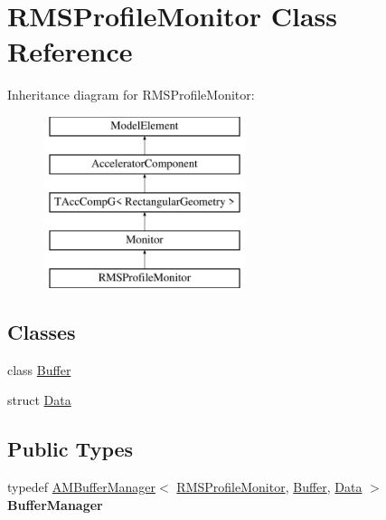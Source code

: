 \hypertarget{classRMSProfileMonitor}{}\section{R\+M\+S\+Profile\+Monitor Class Reference}
\label{classRMSProfileMonitor}
Inheritance diagram for R\+M\+S\+Profile\+Monitor\+:\begin{figure}[H]
\begin{center}
\leavevmode
\includegraphics[height=5.000000cm]{classRMSProfileMonitor}
\end{center}
\end{figure}
\subsection*{Classes}
\begin{DoxyCompactItemize}
\item 
class \hyperlink{classRMSProfileMonitor_1_1Buffer}{Buffer}
\item 
struct \hyperlink{structRMSProfileMonitor_1_1Data}{Data}
\end{DoxyCompactItemize}
\subsection*{Public Types}
\begin{DoxyCompactItemize}
\item 
\mbox{\label{classRMSProfileMonitor_ae765dfc6b1dd16cd6b0518495ea57b05}} 
typedef \hyperlink{classAMBufferManager}{A\+M\+Buffer\+Manager}$<$ \hyperlink{classRMSProfileMonitor}{R\+M\+S\+Profile\+Monitor}, \hyperlink{classRMSProfileMonitor_1_1Buffer}{Buffer}, \hyperlink{structRMSProfileMonitor_1_1Data}{Data} $>$ {\bfseries Buffer\+Manager}
\end{DoxyCompactItemize}
